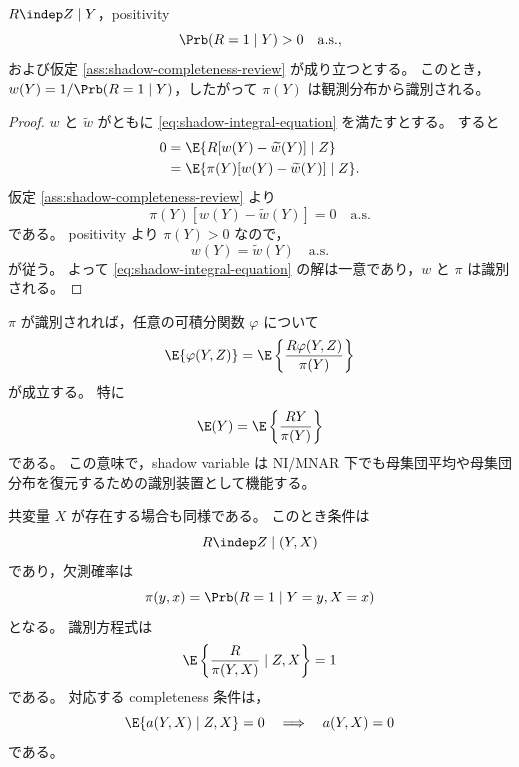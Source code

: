 \begin{proposition}[欠測確率の識別]
\label{prop:shadow-propensity-id}
$R\indep Z\mid Y$，positivity
\begin{equation}
  \Prb(R=1\mid Y)>0 \quad \mathrm{a.s.},
  \label{eq:shadow-positivity-review}
\end{equation}
および仮定 \ref{ass:shadow-completeness-review} が成り立つとする。
このとき，$w(Y)=1/\Prb(R=1\mid Y)$，したがって $\pi(Y)$ は観測分布から識別される。
\end{proposition}

\begin{proof}
$w$ と $\widetilde w$ がともに \eqref{eq:shadow-integral-equation} を満たすとする。
すると
\begin{align}
0
&=
\E\{R[w(Y)-\widetilde w(Y)]\mid Z\} \notag\\
&=
\E\{\pi(Y)[w(Y)-\widetilde w(Y)]\mid Z\}.
\end{align}
仮定 \ref{ass:shadow-completeness-review} より
\begin{equation}
  \pi(Y)[w(Y)-\widetilde w(Y)]=0 \quad \mathrm{a.s.}
\end{equation}
である。
positivity より $\pi(Y)>0$ なので，
\begin{equation}
  w(Y)=\widetilde w(Y)\quad \mathrm{a.s.}
\end{equation}
が従う。
よって \eqref{eq:shadow-integral-equation} の解は一意であり，$w$ と $\pi$ は識別される。
\end{proof}

$\pi$ が識別されれば，任意の可積分関数 $\varphi$ について
\begin{equation}
  \E\{\varphi(Y,Z)\}
  =
  \E\left\{
    \frac{R\varphi(Y,Z)}{\pi(Y)}
  \right\}
  \label{eq:shadow-ipw-functional}
\end{equation}
が成立する。
特に
\begin{equation}
  \E(Y)
  =
  \E\left\{
    \frac{RY}{\pi(Y)}
  \right\}
  \label{eq:shadow-ipw-mean}
\end{equation}
である。
この意味で，shadow variable は NI/MNAR 下でも母集団平均や母集団分布を復元するための識別装置として機能する。

共変量 $X$ が存在する場合も同様である。
このとき条件は
\begin{equation}
  R\indep Z\mid (Y,X)
  \label{eq:shadow-with-x}
\end{equation}
であり，欠測確率は
\begin{equation}
  \pi(y,x)=\Prb(R=1\mid Y=y,X=x)
\end{equation}
となる。
識別方程式は
\begin{equation}
  \E\left\{
    \frac{R}{\pi(Y,X)}
    \mid Z,X
  \right\}
  =
  1
  \label{eq:shadow-with-x-moment}
\end{equation}
である。
対応する completeness 条件は，
\begin{equation}
  \E\{a(Y,X)\mid Z,X\}=0
  \quad\Longrightarrow\quad
  a(Y,X)=0
  \label{eq:shadow-complete-x}
\end{equation}
である。

